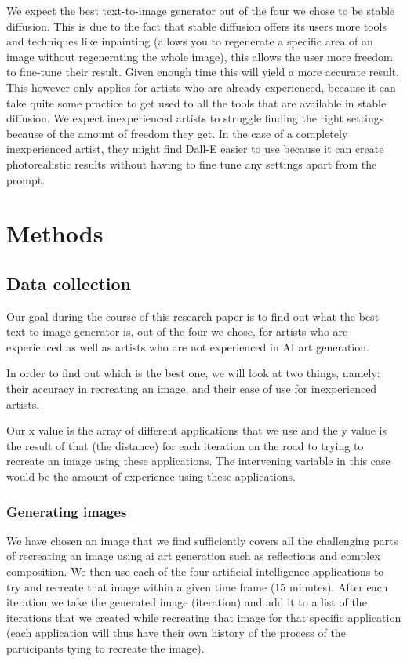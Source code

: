 \documentclass[]{report}
\begin{document}
We expect the best text-to-image generator out of the four we chose to be stable diffusion. This is due to the fact that stable diffusion offers its users more tools and techniques like inpainting (allows you to regenerate a specific area of an image without regenerating the whole image), this allows the user more freedom to fine-tune their result. Given enough time this will yield a more accurate result. This however only applies for artists who are already experienced, because it can take quite some practice to get used to all the tools that are available in stable diffusion. We expect inexperienced artists to struggle finding the right settings because of the amount of freedom they get. In the case of a completely inexperienced artist, they might find Dall-E easier to use because it can create photorealistic results without having to fine tune any settings apart from the prompt.
	
\pagebreak
	
	\section{Methods}
	
	\subsection{Data collection}
	Our goal during the course of this research paper is to find out what the best text to image generator is, out of the four we chose, for artists who are experienced as well as artists who are not experienced in AI art generation.
	
	In order to find out which is the best one, we will look at two things, namely: their accuracy in recreating an image, and their ease of use for inexperienced artists.
	
	Our x value is the array of different applications that we use and the y value is the result of that (the distance) for each iteration on the road to trying to recreate an image using these applications. The intervening variable in this case would be the amount of experience using these applications.
	
	\subsubsection{Generating images}
	We have chosen an image that we find sufficiently covers all the challenging parts of recreating an image using ai art generation such as reflections and complex composition. We then use each of the four artificial intelligence applications to try and recreate that image within a given time frame (15 minutes). After each iteration we take the generated image (iteration) and add it to a list of the iterations that we created while recreating that image for that specific application (each application will thus have their own history of the process of the participants tying to recreate the image). 
	
\end{document}
